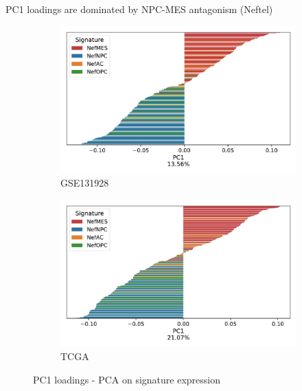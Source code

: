 \documentclass[aspectratio=169,9pt]{beamer}
\begin{document}
    \begin{frame}{PC1 loadings are dominated by NPC-MES antagonism (Neftel)}
        \begin{adjustwidth}{-5cm}{-5cm}
            \centering
            \begin{figure}
                \centering
                \begin{subfigure}[c]{0.48\textwidth}
                    \centering
                    \includegraphics[width=\textwidth]{GSM3828672_loadingsPC1_barplot_Nef}
                    \caption{GSE131928}
                \end{subfigure}
                \begin{subfigure}[c]{0.48\textwidth}
                    \centering
                    \includegraphics[width=\textwidth]{TCGA_loadingsPC1_barplot_Nef}
                    \caption{TCGA}
                \end{subfigure}
                \caption{PC1 loadings - PCA on signature expression}
            \end{figure}
        \end{adjustwidth}
    \end{frame}
\end{document}
